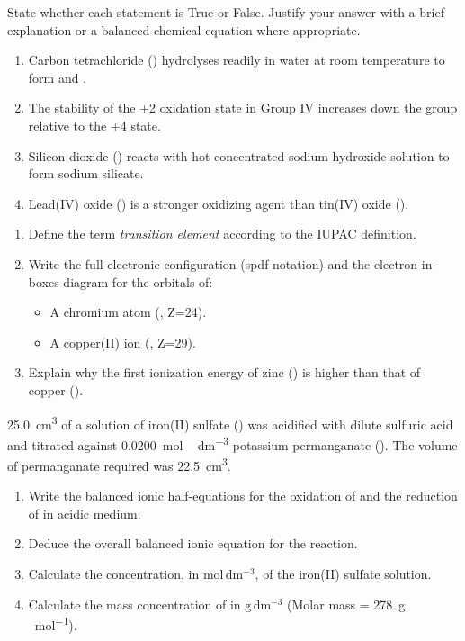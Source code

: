 \documentclass[11pt]{article}
\begin{document}
\begin{exercice}
State whether each statement is True or False. Justify your answer with a brief explanation or a balanced chemical equation where appropriate.
\begin{enumerate}
\item Carbon tetrachloride () hydrolyses readily in water at room temperature to form  and .
\item The stability of the +2 oxidation state in Group IV increases down the group relative to the +4 state.
\item Silicon dioxide () reacts with hot concentrated sodium hydroxide solution to form sodium silicate.
\item Lead(IV) oxide () is a stronger oxidizing agent than tin(IV) oxide ().
\end{enumerate}
\end{exercice}

\begin{exercice}
\begin{enumerate}
\item Define the term \emph{transition element} according to the IUPAC definition.
\item Write the full electronic configuration (spdf notation) and the electron-in-boxes diagram for the  orbitals of:
      \begin{itemize}
      \item A chromium atom (, Z=24).
      \item A copper(II) ion (, Z=29).
      \end{itemize}
\item Explain why the first ionization energy of zinc () is higher than that of copper ().
\end{enumerate}
\end{exercice}

\begin{exercice}
\SI{25.0}{cm^3} of a solution of iron(II) sulfate () was acidified with dilute sulfuric acid and titrated against \SI{0.0200}{mol\,dm^{-3}} potassium permanganate (). The volume of permanganate required was \SI{22.5}{cm^3}.
\begin{enumerate}
\item Write the balanced ionic half-equations for the oxidation of  and the reduction of  in acidic medium.
\item Deduce the overall balanced ionic equation for the reaction.
\item Calculate the concentration, in \ensuremath{\mathrm{mol\,dm^{-3}}}, of the iron(II) sulfate solution.
\item Calculate the mass concentration of  in \ensuremath{\mathrm{g\,dm^{-3}}} (Molar mass = \SI{278}{g\,mol^{-1}}).
\end{enumerate}
\end{exercice}
\end{document}
